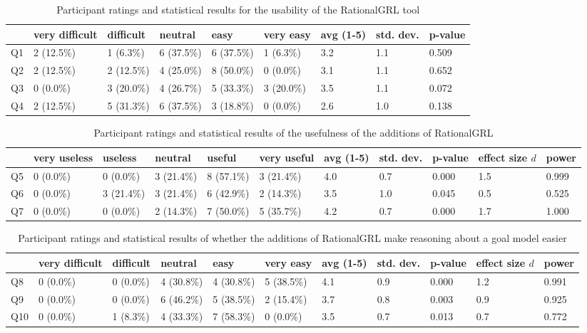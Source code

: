 \begin{table*}[t]
\centering
\begin{tabularx}{0.95\textwidth}{l|l|l|l|l|l||l|l|l}
& very difficult & difficult & neutral & easy & very easy & avg (1-5) & std. dev. & p-value \\
\hline
Q1 & 2 (12.5\%) & 1 (6.3\%)  & 6 (37.5\%) & 6 (37.5\%) & 1 (6.3\%)  & 3.2 & 1.1 & 0.509 \\
Q2 & 2 (12.5\%) & 2 (12.5\%) & 4 (25.0\%) & 8 (50.0\%) & 0 (0.0\%)  & 3.1 & 1.1 & 0.652 \\
Q3 & 0 (0.0\%)  & 3 (20.0\%) & 4 (26.7\%) & 5 (33.3\%) & 3 (20.0\%) & 3.5 & 1.1 & 0.072 \\
Q4 & 2 (12.5\%) & 5 (31.3\%) & 6 (37.5\%) & 3 (18.8\%) & 0 (0.0\%)  & 2.6 & 1.0 & 0.138 
\end{tabularx}
\caption{Participant ratings and statistical results for the usability of the RationalGRL tool}
\label{table:survey:table1}
\end{table*}

\begin{table*}[t]
\centering
\begin{tabularx}{0.95\textwidth}{l|l|l|l|l|l||l|l|l|l|l}
& very useless & useless & neutral & useful & very useful & avg (1-5) & std. dev. & p-value & effect size $d$ & power\\
\hline
Q5 & 0 (0.0\%) & 0 (0.0\%)  & 3 (21.4\%) & 8 (57.1\%) & 3 (21.4\%) & 4.0 & 0.7 & 0.000 & 1.5 & 0.999 \\
Q6 & 0 (0.0\%) & 3 (21.4\%) & 3 (21.4\%) & 6 (42.9\%) & 2 (14.3\%) & 3.5 & 1.0 & 0.045 & 0.5 & 0.525 \\
Q7 & 0 (0.0\%) & 0 (0.0\%)  & 2 (14.3\%) & 7 (50.0\%) & 5 (35.7\%) & 4.2 & 0.7 & 0.000 & 1.7 & 1.000
\end{tabularx}
\caption{Participant ratings and statistical results of the usefulness of the additions of RationalGRL}
\label{table:survey:table2}
\end{table*}

\begin{table*}[t]
\centering
\begin{tabularx}{0.95\textwidth}{l|l|l|l|l|l||l|l|l|l|l}
& very difficult & difficult & neutral & easy & very easy & avg (1-5) & std. dev. & p-value & effect size $d$ & power \\
\hline
Q8  & 0 (0.0\%) & 0 (0.0\%) & 4 (30.8\%) & 4 (30.8\%) & 5 (38.5\%) & 4.1 & 0.9 & 0.000 & 1.2 & 0.991\\
Q9  & 0 (0.0\%) & 0 (0.0\%) & 6 (46.2\%) & 5 (38.5\%) & 2 (15.4\%) & 3.7 & 0.8 & 0.003 & 0.9 & 0.925\\
Q10 & 0 (0.0\%) & 1 (8.3\%) & 4 (33.3\%) & 7 (58.3\%) & 0 (0.0\%)  & 3.5 & 0.7 & 0.013 & 0.7 & 0.772
\end{tabularx}
\caption{Participant ratings and statistical results of whether the additions of RationalGRL make reasoning about a goal model easier}
\label{table:survey:table3}
\end{table*}

